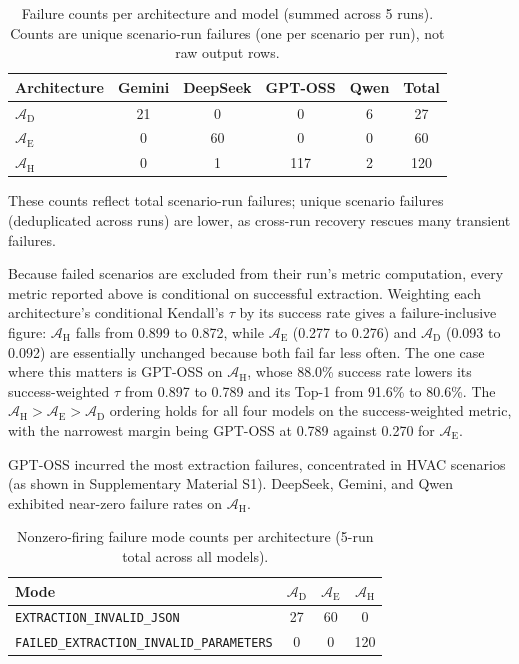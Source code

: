 \documentclass[a4paper,fleqn]{cas-dc}
\begin{document}
\begin{table}[htbp]
\small\centering
\caption{Failure counts per architecture and model (summed across 5 runs). Counts are unique scenario-run failures (one per scenario per run), not raw output rows.}
\label{tab:failure_arch_model}
\begin{tabular}{lccccc}
\toprule
Architecture & Gemini & DeepSeek & GPT-OSS & Qwen & Total \\
\midrule
$\mathcal{A}_{\text{D}}$ & 21 & 0 & 0 & 6 & 27 \\
$\mathcal{A}_{\text{E}}$ & 0 & 60 & 0 & 0 & 60 \\
$\mathcal{A}_{\text{H}}$ & 0 & 1 & 117 & 2 & 120 \\
\bottomrule
\end{tabular}
\end{table}

These counts reflect total scenario-run failures; unique scenario failures (deduplicated across runs) are lower, as cross-run recovery rescues many transient failures.

Because failed scenarios are excluded from their run's metric computation, every metric reported above is conditional on successful extraction. Weighting each architecture's conditional Kendall's $\tau$ by its success rate gives a failure-inclusive figure: $\mathcal{A}_{\text{H}}$ falls from 0.899 to 0.872, while $\mathcal{A}_{\text{E}}$ (0.277 to 0.276) and $\mathcal{A}_{\text{D}}$ (0.093 to 0.092) are essentially unchanged because both fail far less often. The one case where this matters is GPT-OSS on $\mathcal{A}_{\text{H}}$, whose 88.0\% success rate lowers its success-weighted $\tau$ from 0.897 to 0.789 and its Top-1 from 91.6\% to 80.6\%. The $\mathcal{A}_{\text{H}} > \mathcal{A}_{\text{E}} > \mathcal{A}_{\text{D}}$ ordering holds for all four models on the success-weighted metric, with the narrowest margin being GPT-OSS at 0.789 against 0.270 for $\mathcal{A}_{\text{E}}$.

GPT-OSS incurred the most extraction failures, concentrated in HVAC scenarios (as shown in Supplementary Material S1). DeepSeek, Gemini, and Qwen exhibited near-zero failure rates on $\mathcal{A}_{\text{H}}$.

\begin{table}[htbp]
\small\centering
\caption{Nonzero-firing failure mode counts per architecture (5-run total across all models).\protect\footnotemark}
\label{tab:failure_modes}
\begin{tabular}{lccc}
\toprule
Mode & $\mathcal{A}_{\text{D}}$ & $\mathcal{A}_{\text{E}}$ & $\mathcal{A}_{\text{H}}$ \\
\midrule
\texttt{EXTRACTION\_INVALID\_JSON} & 27 & 60 & 0 \\
\texttt{FAILED\_EXTRACTION\_INVALID\_PARAMETERS} & 0 & 0 & 120 \\
\bottomrule
\end{tabular}
\end{table}
\end{document}
